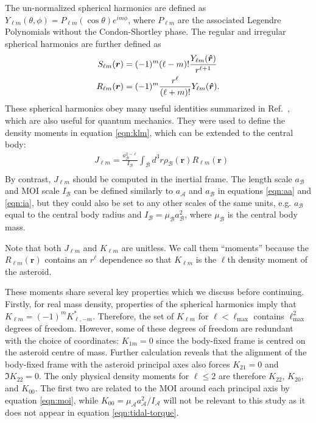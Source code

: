 The un-normalized spherical harmonics are defined as $Y_{\ell m}(\theta, \phi) = P_{\ell m}(\cos \theta)e^{im\phi}$, where $P_{\ell m}$ are the associated Legendre Polynomials without the Condon-Shortley phase. The regular and irregular spherical harmonics are further defined as
\begin{equation}
  \begin{split}
    S_{\ell m}(\bm r) &= (-1)^m (\ell - m)! \frac{Y_{\ell m}(\bm{\hat{r}})}{r^{\ell+1}} \\
    R_{\ell m} (\bm r) &= (-1)^m \frac{r^\ell}{(\ell + m)!} Y_{\ell m}(\bm{\hat{r}}).
  \end{split}
\end{equation}
These spherical harmonics obey many useful identities summarized in Ref.~\cite{Gelderen1998TheSO}, which are also useful for quantum mechanics. They were used to define the density moments in equation \ref{eqn:klm}, which can be extended to the central body:
\begin{equation}
  \begin{split}
    &J_{\ell m} = \frac{a_\mathcal{B}^{2-\ell}}{I_\mathcal{B}} \int_\mathcal{B} d^3 r \rho_\mathcal{B}(\bm r) R_{\ell m}(\bm r)\\
  \end{split}
  \label{eqn:jlm}
\end{equation}
By contrast, $J_{\ell m}$ should be computed in the inertial frame. The length scale $a_\mathcal{B}$ and MOI scale $I_\mathcal{B}$ can be defined similarly to $a_\mathcal{A}$ and $a_\mathcal{B}$ in equations \ref{eqn:aa} and \ref{eqn:ia}, but they could also be set to any other scales of the same units, e.g. $a_\mathcal{B}$ equal to the central body radius and $I_\mathcal{B} = \mu_\mathcal{B}a_\mathcal{B}^2$, where $\mu_\mathcal{B}$ is the central body mass.

Note that both $J_{\ell m}$ and $K_{\ell m}$ are unitless. We call them ``moments'' because the $R_{\ell m}(\bm r)$ contains an $r^\ell$ dependence so that $K_{\ell m}$ is the $\ell$th density moment of the asteroid.

These moments share several key properties which we discuss before continuing. Firstly, for real mass density, properties of the spherical harmonics imply that $K_{\ell m} = (-1)^m K_{\ell, -m}^*$. Therefore, the set of $K_{\ell m}$ for $\ell < \ell_\text{max}$ contains $\ell_\text{max}^2$ degrees of freedom. However, some of these degrees of freedom are redundant with the choice of coordinates: $K_{1m} = 0$ since the body-fixed frame is centred on the asteroid centre of mass. Further calculation reveals that the alignment of the body-fixed frame with the asteroid principal axes also forces $K_{21}= 0$ and $\Im K_{22}=0$. The only physical density moments for $\ell \leq 2$ are therefore $K_{22}$, $K_{20}$, and $K_{00}$. The first two are related to the MOI around each principal axis by equation \ref{eqn:moi}, while $K_{00} = \mu_\mathcal{A} a_\mathcal{A}^2 / I_\mathcal{A}$ will not be relevant to this study as it does not appear in equation \ref{eqn:tidal-torque}. 

